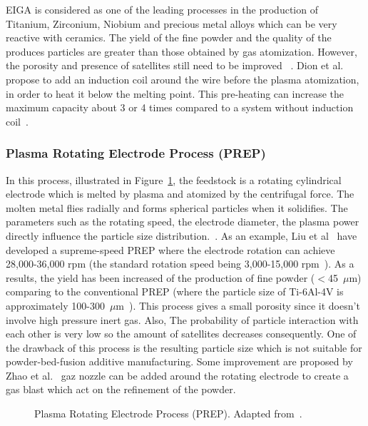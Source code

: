 \documentclass[../main]{subfiles}
\begin{document}
EIGA is considered as one of the leading processes in the production of Titanium, Zirconium, Niobium and precious metal alloys which can be very reactive with ceramics. The yield of the fine powder and the quality of the produces particles are greater than those obtained by gas atomization. However, the porosity and presence of satellites still need to be improved ~\cite{Jang2020PowderBased, Wegmann2003TemperatureInduced}. Dion et al. propose to add an induction coil around the wire before the plasma atomization, in order to heat it below the melting point. This pre-heating can increase the maximum capacity about 3 or 4 times compared to a system without induction coil~\cite{Dion2018PlasmaApparatus}.

\subsubsection{Plasma Rotating Electrode Process (PREP)}

In this process, illustrated in Figure~\ref{f:prep}, the feedstock is a rotating cylindrical electrode which is melted by plasma and atomized by the centrifugal force. The molten metal flies radially and forms spherical particles when it solidifies. The parameters such as the rotating speed, the electrode diameter, the plasma power directly influence the particle size distribution.~\cite{Zhao2020CentrifugalGranulation}. As an example, Liu et al~\cite{Liu2020BriefIntroduction} have developed a supreme-speed PREP where the electrode rotation can achieve 28,000-36,000 rpm (the standard rotation speed being 3,000-15,000 rpm~\cite{Jang2020PowderBased}). As a results, the yield has been increased of the production of fine powder ($<$45~$\mu$m) comparing to the conventional PREP (where the particle size of Ti-6Al-4V is approximately 100-300~$\mu$m~\cite{Jang2020PowderBased}). This process gives a small porosity since it doesn't involve high pressure inert gas. Also, The probability of particle interaction with each other is very low so the amount of satellites decreases consequently. One of the drawback of this process is the resulting particle size which is not suitable for powder-bed-fusion additive manufacturing. Some improvement are proposed by Zhao et al.~\cite{Zhao2020CentrifugalGranulation} gaz nozzle can be added around the rotating electrode to create a gas blast which act on the refinement of the powder.

\vspace{0mm}
\begin{figure}[H]
    \centering
        
        \caption[Plasma Rotating Electrode Process (PREP)]{Plasma Rotating Electrode Process (PREP). Adapted from~\cite{Chen2018ComparativeStudy, Zhao2020CentrifugalGranulation,Wu2025ReviewMetal}.}
        \label{f:prep}
\end{figure}
\FloatBarrier
\vspace{0mm}
\end{document}
